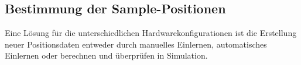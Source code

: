 \subsection{Bestimmung der Sample-Positionen}
\label{sub:Bestimmung der Sample-Positionen}

Eine Lösung für die unterschiedlichen Hardwarekonfigurationen ist die Erstellung
neuer Positionsdaten entweder durch manuelles Einlernen, automatisches Einlernen
oder berechnen und überprüfen in Simulation.




